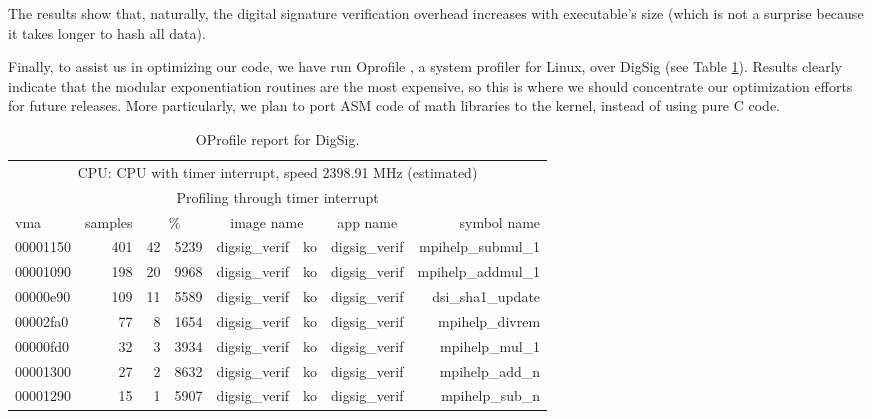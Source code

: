 \documentclass{article}
\begin{document}

The results show that, naturally, the digital signature verification
overhead increases with executable's size (which is not a surprise
because it takes longer to hash all data).

Finally, to assist us in optimizing our code, we have run Oprofile
\cite{OProfile}, a system profiler for Linux, over DigSig (see Table \ref{tab:Oprofile}). Results
clearly indicate that the modular exponentiation routines are the most
expensive, so this is where we should concentrate our optimization
efforts for future releases. More particularly, we plan to port ASM
code of math libraries to the kernel, instead of using pure C code.

\begin{table}[ht]
\begin{center}
\begin{tabular}{l r r @{.} l r @{.} l c r}
\multicolumn{8}{c}{CPU: CPU with timer interrupt, speed 2398.91 MHz (estimated)} \\
\multicolumn{8}{c}{Profiling through timer interrupt} \\
vma & samples & \multicolumn{2}{c}{\%} & \multicolumn{2}{c}{image name} & app name & symbol name \\
00001150 & 401 & 42&5239 & digsig\_verif&ko & digsig\_verif & mpihelp\_submul\_1 \\
00001090 & 198 & 20&9968 & digsig\_verif&ko & digsig\_verif & mpihelp\_addmul\_1 \\
00000e90 & 109 & 11&5589 & digsig\_verif&ko & digsig\_verif & dsi\_sha1\_update \\
00002fa0 & 77 & 8&1654 & digsig\_verif&ko & digsig\_verif & mpihelp\_divrem \\
00000fd0 & 32 & 3&3934 & digsig\_verif&ko & digsig\_verif & mpihelp\_mul\_1 \\
00001300 & 27 & 2&8632 & digsig\_verif&ko & digsig\_verif & mpihelp\_add\_n \\
00001290 & 15 & 1&5907 & digsig\_verif&ko & digsig\_verif & mpihelp\_sub\_n \\
\end{tabular}
\caption{OProfile report for DigSig.}
\label{tab:Oprofile}
\end{center}
\end{table} 
\end{document}
